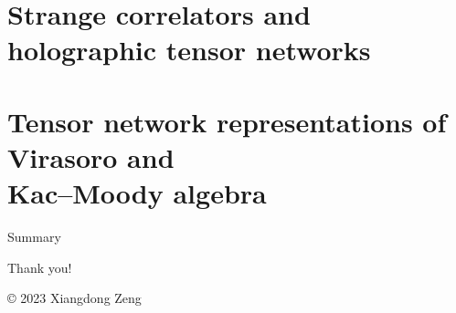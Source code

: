 \documentclass{fdubeamer}
\begin{document}
\section{Strange correlators and holographic tensor networks}

\section{Tensor network representations of Virasoro and \\ Kac--Moody algebra}

\begin{frame}{Summary}
\end{frame}

\begingroup
  \begin{frame}[plain]
    \vfill
    \color{white}\LARGE\centering
    Thank you!
    \par
    \vspace{6em}
    \scriptsize
    \copyright{} 2023 Xiangdong Zeng
    \par
    \vspace{-12em}
  \end{frame}
\endgroup
\end{document}
